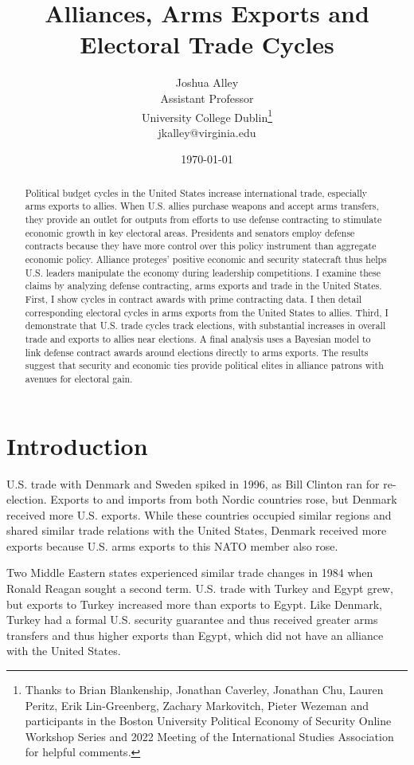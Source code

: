 \documentclass[12pt]{article}
\title{\textbf{Alliances, Arms Exports and Electoral Trade Cycles}}
\author{Joshua Alley \\
Assistant Professor \\
University College Dublin\thanks{Thanks to Brian Blankenship, Jonathan Caverley, Jonathan Chu, Lauren Peritz, Erik Lin-Greenberg, Zachary Markovitch, Pieter Wezeman and participants in the Boston University Political Economy of Security Online Workshop Series and 2022 Meeting of the International Studies Association for helpful comments.} \\
jkalley@virginia.edu
}
\date{\today}
\begin{document}
\maketitle 

\begin{abstract} 
Political budget cycles in the United States increase international trade, especially arms exports to allies. 
When U.S. allies purchase weapons and accept arms transfers, they provide an outlet for outputs from efforts to use defense contracting to stimulate economic growth in key electoral areas.
Presidents and senators employ defense contracts because they have more control over this policy instrument than aggregate economic policy.
Alliance proteges' positive economic and security statecraft thus helps U.S. leaders manipulate the economy during leadership competitions.  
I examine these claims by analyzing defense contracting, arms exports and trade in the United States. 
First, I show cycles in contract awards with prime contracting data.
I then detail corresponding electoral cycles in arms exports from the United States to allies. 
Third, I demonstrate that U.S. trade cycles track elections, with substantial increases in overall trade and exports to allies near elections.
A final analysis uses a Bayesian model to link defense contract awards around elections directly to arms exports.
The results suggest that security and economic ties provide political elites in alliance patrons with avenues for electoral gain. 
\end{abstract} 


\newpage 
\doublespace 


\section{Introduction}


U.S. trade with Denmark and Sweden spiked in 1996, as Bill Clinton ran for re-election.
Exports to and imports from both Nordic countries rose, but Denmark received more U.S. exports.
While these countries occupied similar regions and shared similar trade relations with the United States, Denmark received more exports because U.S. arms exports to this NATO member also rose.


Two Middle Eastern states experienced similar trade changes in 1984 when Ronald Reagan sought a second term.
U.S. trade with Turkey and Egypt grew, but exports to Turkey increased more than exports to Egypt. 
Like Denmark, Turkey had a formal U.S. security guarantee and thus received greater arms transfers and thus higher exports than Egypt, which did not have an alliance with the United States. 
\end{document}

